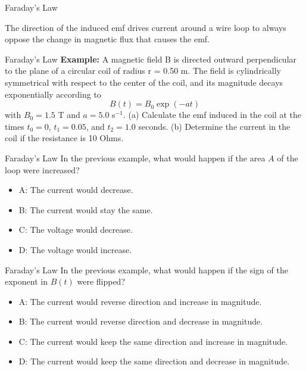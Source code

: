\documentclass{beamer}
\begin{document}
\begin{frame}{Faraday's Law}
\begin{tcolorbox}[colback=white,colframe=black!40!black,title=Lenz's Law]
\alert{The direction of the induced emf drives current around a wire loop to always oppose the change in magnetic flux that
causes the emf.}
\end{tcolorbox}
\end{frame}

\begin{frame}{Faraday's Law}
\small
\textbf{Example:}
A magnetic field B is directed outward perpendicular to the plane of a circular coil of radius r = 0.50 m.  The field is cylindrically symmetrical with respect to the center of the coil, and its magnitude decays exponentially according to
\begin{equation}
B(t) = B_0 \exp(-a t)
\end{equation}
with $B_0 = 1.5$ T and $a = 5.0$ s$^{-1}$.  (a) Calculate the emf induced in the coil at the times $t_0 = 0$, $t_1 = 0.05$, and $t_2 = 1.0$ seconds. (b) Determine the current in the coil if the resistance is 10 Ohms. 
\end{frame}

\begin{frame}{Faraday's Law}
In the previous example, what would happen if the area $A$ of the loop were increased?
\begin{itemize}
\item A: The current would decrease.
\item B: The current would stay the same.
\item C: The voltage would decrease.
\item D: The voltage would increase.
\end{itemize}
\end{frame}

\begin{frame}{Faraday's Law}
In the previous example, what would happen if the sign of the exponent in $B(t)$ were flipped?
\begin{itemize}
\item A: The current would reverse direction and increase in magnitude.
\item B: The current would reverse direction and decrease in magnitude.
\item C: The current would keep the same direction and increase in magnitude.
\item D: The current would keep the same direction and decrease in magnitude.
\end{itemize}
\end{frame}
\end{document}
